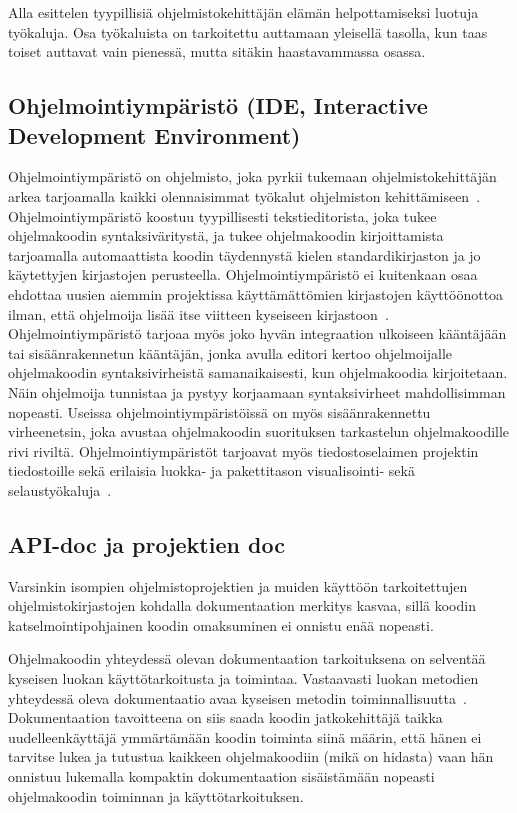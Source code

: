 \documentclass[finnish]{tktltiki2}
\theoremstyle{definition}
\theoremstyle{remark}
\begin{document}
Alla esittelen tyypillisiä ohjelmistokehittäjän elämän helpottamiseksi luotuja työkaluja. Osa työkaluista on tarkoitettu auttamaan yleisellä tasolla, kun taas toiset auttavat vain pienessä, mutta sitäkin haastavammassa osassa.



\subsection{Ohjelmointiympäristö (IDE, Interactive Development Environment)}
Ohjelmointiympäristö on ohjelmisto, joka pyrkii tukemaan ohjelmistokehittäjän arkea tarjoamalla kaikki olennaisimmat työkalut ohjelmiston kehittämiseen~\cite{eclipse-ide}. Ohjelmointiympäristö koostuu tyypillisesti tekstieditorista, joka tukee ohjelmakoodin syntaksiväritystä, ja tukee  ohjelmakoodin kirjoittamista tarjoamalla automaattista koodin täydennystä kielen standardikirjaston ja jo käytettyjen kirjastojen perusteella. Ohjelmointiympäristö ei kuitenkaan osaa ehdottaa uusien aiemmin projektissa käyttämättömien kirjastojen käyttöönottoa ilman, että ohjelmoija lisää itse viitteen kyseiseen kirjastoon~\cite{jungloid-mining}.
Ohjelmointiympäristö tarjoaa myös joko hyvän integraation ulkoiseen kääntäjään tai sisäänrakennetun kääntäjän, jonka avulla editori kertoo ohjelmoijalle ohjelmakoodin syntaksivirheistä samanaikaisesti, kun ohjelmakoodia kirjoitetaan. Näin ohjelmoija tunnistaa ja pystyy korjaamaan syntaksivirheet mahdollisimman nopeasti.
Useissa ohjelmointiympäristöissä on myös sisäänrakennettu virheenetsin, joka avustaa ohjelmakoodin suorituksen tarkastelun ohjelmakoodille rivi riviltä. Ohjelmointiympäristöt tarjoavat myös tiedostoselaimen projektin tiedostoille sekä erilaisia luokka- ja pakettitason visualisointi- sekä selaustyökaluja~\cite{eclipse-ide}.

\subsection{API-doc ja projektien doc}
Varsinkin isompien ohjelmistoprojektien ja muiden käyttöön tarkoitettujen ohjelmistokirjastojen kohdalla dokumentaation merkitys kasvaa, sillä koodin katselmointipohjainen koodin omaksuminen ei onnistu enää nopeasti.

Ohjelmakoodin yhteydessä olevan dokumentaation tarkoituksena on selventää kyseisen luokan käyttötarkoitusta ja toimintaa. Vastaavasti luokan metodien yhteydessä oleva dokumentaatio avaa kyseisen metodin toiminnallisuutta~\cite{javadoc}.
Dokumentaation tavoitteena on siis saada koodin jatkokehittäjä taikka uudelleenkäyttäjä ymmärtämään koodin toiminta siinä määrin, että hänen ei tarvitse lukea ja tutustua kaikkeen ohjelmakoodiin (mikä on hidasta) vaan hän onnistuu lukemalla kompaktin dokumentaation sisäistämään nopeasti ohjelmakoodin toiminnan ja käyttötarkoituksen.
\end{document}
